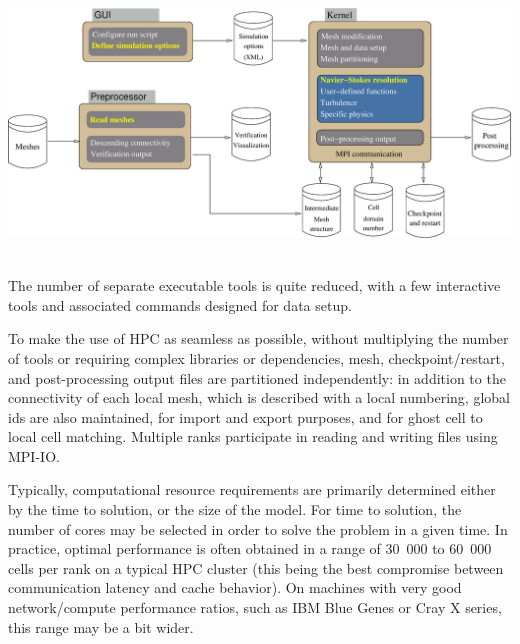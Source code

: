 ~\
\includegraphics[scale=0.2]{pictures/cs_components.eps}
\label{fig:cs_components}
\vspace{+0.04in}
~\

The number of separate executable tools is quite reduced, with a few
interactive tools and associated commands designed for data setup.

To make the use of HPC as seamless as possible, without multiplying the
number of tools or requiring complex libraries or dependencies,
mesh, checkpoint/restart, and post-processing output files
are partitioned independently: in addition to the connectivity of each
local mesh, which is described with a local numbering, global ids are also
maintained, for import and export purposes, and for ghost cell to
local cell matching. Multiple ranks participate in reading and writing
files using MPI-IO.

Typically, computational resource requirements are primarily determined
either by the time to solution, or the size of the model. For time to
solution, the number of cores may be selected in order to solve the problem
in a given time. In practice, optimal performance is often obtained
in a range of 30~000 to 60~000 cells per rank on a typical HPC cluster
(this being the best compromise between communication latency and
cache behavior). On machines with very good network/compute performance
ratios, such as IBM Blue Genes or Cray X series, this range may be
a bit wider.
